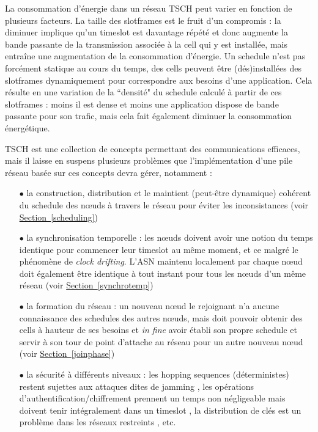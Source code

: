\documentclass[]{report}
\newcommand{\wordlink}[2]{\hyperref[#2]{#1~\ref{#2}}}
\begin{document}
\vspace{0.7cm}

La consommation d'énergie dans un réseau TSCH peut varier en fonction de plusieurs facteurs. La taille des slotframes est le fruit d'un compromis : la diminuer implique qu'un timeslot est davantage répété et donc augmente la bande passante de la transmission associée à la cell qui y est installée, mais entraîne une augmentation de la consommation d'énergie. Un schedule n'est pas forcément statique au cours du temps, des cells peuvent être (dés)installées des slotframes dynamiquement pour correspondre aux besoins d'une application. Cela résulte en une variation de la ``densité" du schedule calculé à partir de ces slotframes : moins il est dense et moins une application dispose de bande passante pour son trafic, mais cela fait également diminuer la consommation énergétique.\\

\newpage

\par TSCH est une collection de concepts permettant des communications efficaces, mais il laisse en suspens plusieurs problèmes que l'implémentation d'une pile réseau basée sur ces concepts devra gérer, notamment :

\vspace{0.2cm}

\begin{itemize}
\item[$\bullet$] la construction, distribution et le maintient (peut-être dynamique) cohérent du schedule des nœuds à travers le réseau pour éviter les inconsistances (voir \wordlink{Section}{scheduling})
\vspace{0.2cm}
\item[$\bullet$] la synchronisation temporelle : les nœuds doivent avoir une notion du temps identique pour commencer leur timeslot au même moment, et ce malgré le phénomène de \textit{clock drifting}. L'ASN maintenu localement par chaque nœud doit également être identique à tout instant pour tous les nœuds d'un même réseau (voir \wordlink{Section}{synchrotemp})
\vspace{0.2cm}
\item[$\bullet$] la formation du réseau : un nouveau nœud le rejoignant n'a aucune connaissance des schedules des autres nœuds, mais doit pouvoir obtenir des cells à hauteur de ses besoins et \textit{in fine} avoir établi son propre schedule et servir à son tour de point d'attache au réseau pour un autre nouveau nœud (voir \wordlink{Section}{joinphase})
\vspace{0.2cm}
\item[$\bullet$] la sécurité à différents niveaux : les hopping sequences (déterministes) restent sujettes aux attaques dites de jamming \cite{R-TSCH} \cite{tiloca-6tisch-robust-scheduling-02}, les opérations d'authentification/chiffrement prennent un temps non négligeable mais doivent tenir intégralement dans un timeslot \cite{link-layer-sec-impact}, la distribution de clés est un problème dans les réseaux restreints \cite{ietf-6tisch-minimal-security-15} \cite{ietf-6tisch-dtsecurity-zerotouch-join-04}, etc.
\end{itemize}
\end{document}
